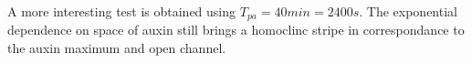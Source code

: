 
A more interesting test is obtained using $T_{pa} = 40 min = 2400 s$. The exponential dependence on space of auxin still brings a homoclinc stripe in correspondance to the auxin maximum and open channel.

